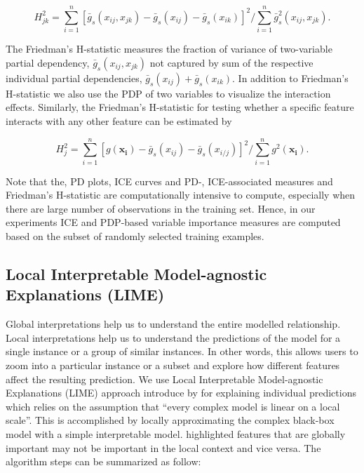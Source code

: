 \documentclass[11pt,a4paper,]{article}
\begin{document}
\[H_{jk}^2=\sum_{i=1}^{n}[\bar{g}_{s}(x_{ij}, x_{jk})-\bar{g}_{s}(x_{ij})-\bar{g}_{s}(x_{ik})]^2/\sum_{i=1}^{n}\bar{g}^2_{s}(x_{ij}, x_{jk}).\]

The Friedman's H-statistic measures the fraction of variance of two-variable partial dependency, \(\bar{g}_{s}(x_{ij}, x_{jk})\) not captured by sum of the respective individual partial dependencies, \(\bar{g}_{s}(x_{ij})+\bar{g}_{s}(x_{ik})\). In addition to Friedman's H-statistic we also use the PDP of two variables to visualize the interaction effects. Similarly, the Friedman's H-statistic for testing whether a specific feature interacts with any other feature can be estimated by

\[H_{j}^2=\sum_{i=1}^{n}[{g}(\bm{x_{i}})-\bar{g}_{s}(x_{ij})-\bar{g}_{s}(x_{i/j})]^2/\sum_{i=1}^{n}g^2(\bm{x_{i}}).\]

Note that the, PD plots, ICE curves and PD-, ICE-associated measures and Friedman's H-statistic are computationally intensive to compute, especially when there are large number of observations in the training set. Hence, in our experiments ICE and PDP-based variable importance measures are computed based on the subset of randomly selected training examples.

\hypertarget{local-interpretable-model-agnostic-explanations-lime}{%
\subsection{Local Interpretable Model-agnostic Explanations (LIME)}\label{local-interpretable-model-agnostic-explanations-lime}}

Global interpretations help us to understand the entire modelled relationship. Local interpretations help us to understand the predictions of the model for a single instance or a group of similar instances. In other words, this allows users to zoom into a particular instance or a subset and explore how different features affect the resulting prediction. We use Local Interpretable Model-agnostic Explanations (LIME) approach introduce by \textcite{ribeiro2016should} for explaining individual predictions which relies on the assumption that ``every complex model is linear on a local scale''. This is accomplished by locally approximating the complex black-box model with a simple interpretable model. \textcite{ribeiro2016should} highlighted features that are globally important may not be important in the local context and vice versa. The algorithm steps can be summarized as follow:
\end{document}
